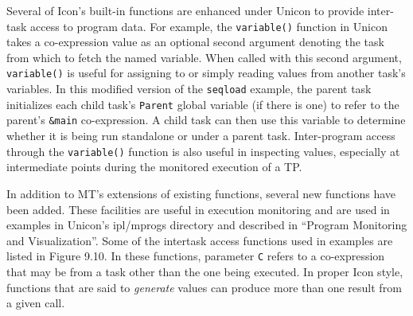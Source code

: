 
Several of Icon's built-in functions are enhanced under Unicon
to provide inter-task access to program data.  For example, the
{\tt variable()} function in Unicon takes a co-expression value as an
optional second argument denoting the task from which to fetch the named
variable.  When called with this second argument, {\tt variable()} is
useful for assigning to or simply reading values from another task's
variables.  In this modified version of the {\tt seqload} example, the
parent task initializes each child task's {\tt Parent} global
variable (if there is one) to refer to the parent's {\tt \&main}
co-expression.  A child task can then use this variable to determine
whether it is being run standalone or under a parent task.
Inter-program access through the {\tt variable()} function is also
useful in inspecting values, especially at intermediate points during
the monitored execution of a TP.


In addition to MT's extensions of existing functions, several new
functions have been added.  These facilities are useful in execution
monitoring and are used in examples in Unicon's ipl/mprogs directory
and described in ``Program Monitoring and
Visualization''. Some of
the intertask access functions used in examples are listed in Figure
9.10.  In these functions, parameter {\tt C} refers to a co-expression
that may be from a task other than the one being executed.  In proper
Icon style, functions that are said to {\em generate} values can produce
more than one result from a given call.


